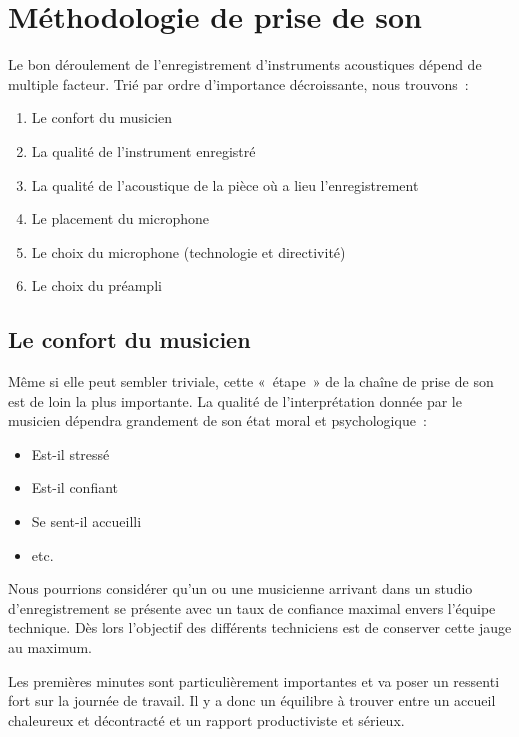 \documentclass[
]{book}
\providecommand{\tightlist}{%
  \setlength{\itemsep}{0pt}\setlength{\parskip}{0pt}}
\begin{document}
\hypertarget{muxe9thodologie-de-prise-de-son}{%
\chapter{Méthodologie de prise de son}\label{muxe9thodologie-de-prise-de-son}}

Le bon déroulement de l'enregistrement d'instruments acoustiques dépend de multiple facteur. Trié par ordre d'importance décroissante, nous trouvons~:

\begin{enumerate}
\def\labelenumi{\arabic{enumi}.}
\tightlist
\item
  Le confort du musicien
\item
  La qualité de l'instrument enregistré
\item
  La qualité de l'acoustique de la pièce où a lieu l'enregistrement
\item
  Le placement du microphone
\item
  Le choix du microphone (technologie et directivité)
\item
  Le choix du préampli
\end{enumerate}

\hypertarget{le-confort-du-musicien}{%
\section{Le confort du musicien}\label{le-confort-du-musicien}}

Même si elle peut sembler triviale, cette «~étape~» de la chaîne de prise de son est de loin la plus importante.
La qualité de l'interprétation donnée par le musicien dépendra grandement de son état moral et psychologique~:

\begin{itemize}
\tightlist
\item
  Est-il stressé
\item
  Est-il confiant
\item
  Se sent-il accueilli
\item
  etc.
\end{itemize}

Nous pourrions considérer qu'un ou une musicienne arrivant dans un studio d'enregistrement se présente avec un taux de confiance maximal envers l'équipe technique. Dès lors l'objectif des différents techniciens est de conserver cette jauge au maximum.

Les premières minutes sont particulièrement importantes et va poser un ressenti fort sur la journée de travail. Il y a donc un équilibre à trouver entre un accueil chaleureux et décontracté et un rapport productiviste et sérieux.
\end{document}
